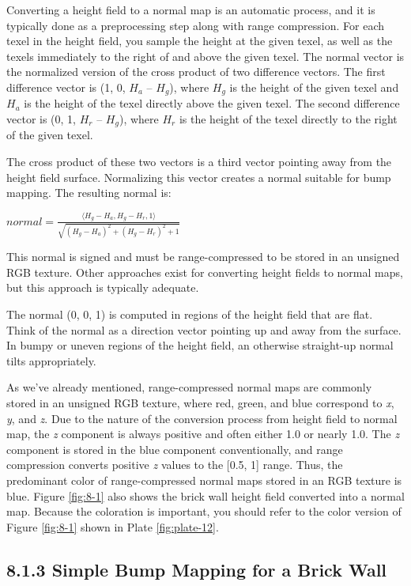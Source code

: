 \documentclass[../main.tex]{subfiles}
\begin{document}
Converting a height field to a normal map is an automatic process, and it is typically done as a preprocessing step along with range compression. For each texel in the height field, you sample the height at the given texel, as well as the texels immediately to the right of and above the given texel. The normal vector is the normalized version of the cross product of two difference vectors. The first difference vector is (1, 0, $H_a$ – $H_g$), where $H_g$ is the height of the given texel and $H_a$ is the height of the texel directly above the given texel. The second difference vector is (0, 1, $H_r$ – $H_g$), where $H_r$ is the height of the texel directly to the right of the given texel.

The cross product of these two vectors is a third vector pointing away from the height field surface. Normalizing this vector creates a normal suitable for bump mapping. The resulting normal is:

$
normal = \frac{\langle H_g - H_a, H_g - H_r, 1 \rangle}{\sqrt{(H_g - H_a)^2 + (H_g - H_r)^2 + 1}}
$

This normal is signed and must be range-compressed to be stored in an unsigned RGB texture. Other approaches exist for converting height fields to normal maps, but this approach is typically adequate.

The normal (0, 0, 1) is computed in regions of the height field that are flat. Think of the normal as a direction vector pointing up and away from the surface. In bumpy or uneven regions of the height field, an otherwise straight-up normal tilts appropriately.

As we've already mentioned, range-compressed normal maps are commonly stored in an unsigned RGB texture, where red, green, and blue correspond to \textit{x}, \textit{y}, and \textit{z}. Due to the nature of the conversion process from height field to normal map, the \textit{z} component is always positive and often either 1.0 or nearly 1.0. The \textit{z} component is stored in the blue component conventionally, and range compression converts positive \textit{z} values to the [0.5, 1] range. Thus, the predominant color of range-compressed normal maps stored in an RGB texture is blue. Figure \ref{fig:8-1} also shows the brick wall height field converted into a normal map. Because the coloration is important, you should refer to the color version of Figure \ref{fig:8-1} shown in Plate \ref{fig:plate-12}.

\subsection{8.1.3 Simple Bump Mapping for a Brick Wall}
\end{document}

